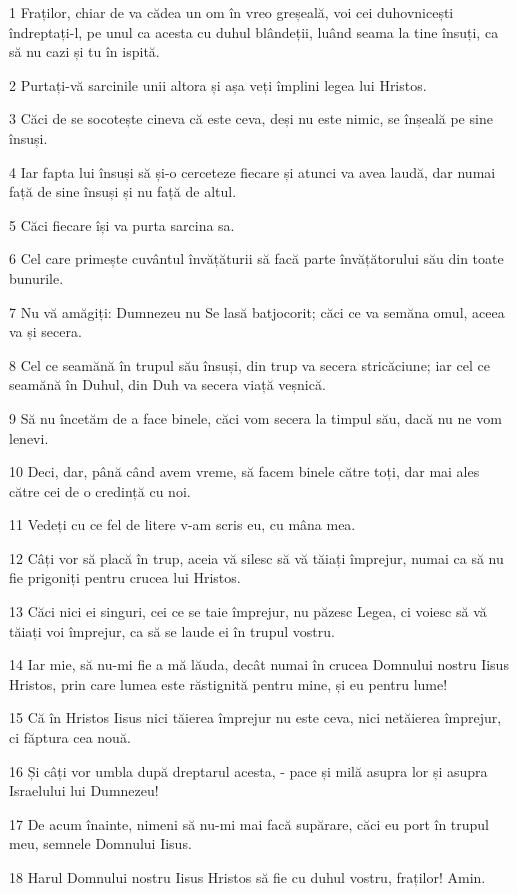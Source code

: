 \par 1 Fraților, chiar de va cădea un om în vreo greșeală, voi cei duhovnicești îndreptați-l, pe unul ca acesta cu duhul blândeții, luând seama la tine însuți, ca să nu cazi și tu în ispită.
\par 2 Purtați-vă sarcinile unii altora și așa veți împlini legea lui Hristos.
\par 3 Căci de se socotește cineva că este ceva, deși nu este nimic, se înșeală pe sine însuși.
\par 4 Iar fapta lui însuși să și-o cerceteze fiecare și atunci va avea laudă, dar numai față de sine însuși și nu față de altul.
\par 5 Căci fiecare își va purta sarcina sa.
\par 6 Cel care primește cuvântul învățăturii să facă parte învățătorului său din toate bunurile.
\par 7 Nu vă amăgiți: Dumnezeu nu Se lasă batjocorit; căci ce va semăna omul, aceea va și secera.
\par 8 Cel ce seamănă în trupul său însuși, din trup va secera stricăciune; iar cel ce seamănă în Duhul, din Duh va secera viață veșnică.
\par 9 Să nu încetăm de a face binele, căci vom secera la timpul său, dacă nu ne vom lenevi.
\par 10 Deci, dar, până când avem vreme, să facem binele către toți, dar mai ales către cei de o credință cu noi.
\par 11 Vedeți cu ce fel de litere v-am scris eu, cu mâna mea.
\par 12 Câți vor să placă în trup, aceia vă silesc să vă tăiați împrejur, numai ca să nu fie prigoniți pentru crucea lui Hristos.
\par 13 Căci nici ei singuri, cei ce se taie împrejur, nu păzesc Legea, ci voiesc să vă tăiați voi împrejur, ca să se laude ei în trupul vostru.
\par 14 Iar mie, să nu-mi fie a mă lăuda, decât numai în crucea Domnului nostru Iisus Hristos, prin care lumea este răstignită pentru mine, și eu pentru lume!
\par 15 Că în Hristos Iisus nici tăierea împrejur nu este ceva, nici netăierea împrejur, ci făptura cea nouă.
\par 16 Și câți vor umbla după dreptarul acesta, - pace și milă asupra lor și asupra Israelului lui Dumnezeu!
\par 17 De acum înainte, nimeni să nu-mi mai facă supărare, căci eu port în trupul meu, semnele Domnului Iisus.
\par 18 Harul Domnului nostru Iisus Hristos să fie cu duhul vostru, fraților! Amin.


